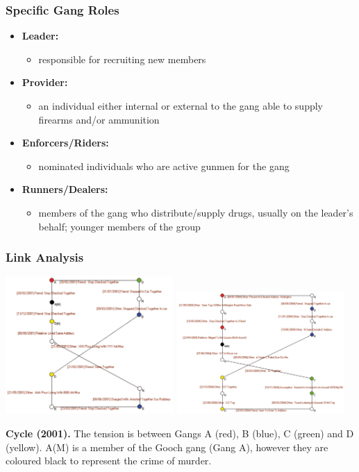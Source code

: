 \documentclass[pdftex]{beamer}
\begin{document}
\begin{frame}
\frametitle{Specific Gang Roles}
\begin{itemize}
\item {\textbf{Leader:}}
\begin{itemize}
\item responsible for recruiting new members
\end{itemize}
\item {\textbf{Provider:}}
\begin{itemize}
\item an individual either internal or external to the gang able to
  supply firearms and/or ammunition
\end{itemize}
\item {\textbf{Enforcers/Riders:}}
\begin{itemize}
\item nominated individuals who are active gunmen for the gang
\end{itemize}
\item {\textbf{Runners/Dealers:}}
\begin{itemize}
\item members of the gang who distribute/supply drugs, usually on the
  leader's behalf; younger members of the group
\end{itemize}
\end{itemize}
\end{frame}

\begin{frame}
\frametitle{Link Analysis}
\begin{center}
\includegraphics[width=0.48\textwidth]{../images/chain2001.pdf}
\hfill
\includegraphics[width=0.48\textwidth]{../images/chain2004.pdf}
\end{center}
\scriptsize{{\textbf{Cycle (2001).}} The tension is between Gangs A
(red), B (blue), C (green) and D (yellow). A(M) is a member of the
Gooch gang (Gang A), however they are coloured black to represent the
crime of murder.}
\end{frame}
\end{document}
